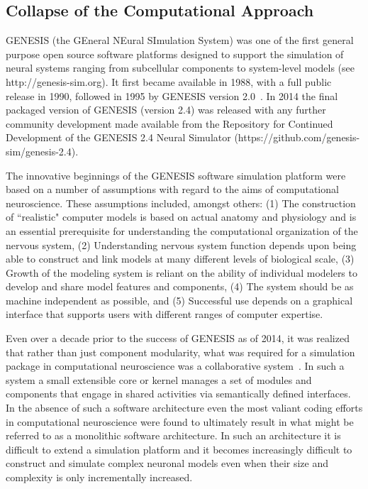 \documentclass[11pt,3p,twocolumn]{JMN}
\begin{document}
\subsection{Collapse of the Computational Approach}

GENESIS (the GEneral NEural SImulation System) was one of the first general purpose open source software platforms designed to support the simulation of neural systems ranging from subcellular components to system-level models (see http://genesis-sim.org). It first became available in 1988, with a full public release in 1990, followed in 1995 by GENESIS version 2.0~\citep{jung22}. In 2014 the final packaged version of GENESIS (version 2.4) was released with any further community development made available from the Repository for Continued Development of the GENESIS 2.4 Neural Simulator (https://github.com/genesis-sim/genesis-2.4).

The innovative beginnings of the GENESIS software simulation platform were based on a number of assumptions with regard to the aims of computational neuroscience. These assumptions included, amongst others: (1) The construction of ``realistic" computer models is based on actual anatomy and physiology and is an essential prerequisite for understanding the computational organization of the nervous system, (2) Understanding nervous system function depends upon being able to construct and link models at many different levels of biological scale, (3) Growth of the modeling system is reliant on the ability of individual modelers to develop and share model features and components, (4) The system should be as machine independent as possible, and (5) Successful use depends on a graphical interface that supports users with different ranges of computer expertise.

Even over a decade prior to the success of GENESIS as of 2014, it was realized that rather than just component modularity, what was required for a simulation package in computational neuroscience was a collaborative system~\citep{cornelis03}. In such a system a small extensible core or kernel manages a set of modules and components that engage in shared activities via semantically defined interfaces. In the absence of such a software architecture even the most valiant coding efforts in computational neuroscience were found to ultimately result in what might be referred to as a monolithic software architecture. In such an architecture it is difficult to extend a simulation platform and it becomes increasingly difficult to construct and simulate complex neuronal models even when their size and complexity is only incrementally increased.
\end{document}
